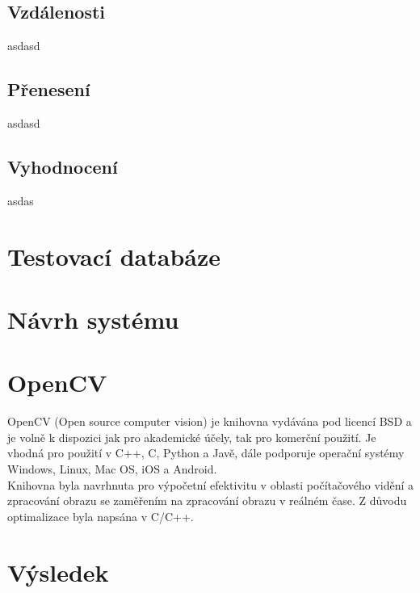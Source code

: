 \documentclass[czech,BP]{thesiskiv}
\begin{document}
\section{Vzdálenosti}
asdasd
\section{Přenesení}
asdasd
\section{Vyhodnocení}
asdas
\chapter{Testovací databáze}
\chapter{Návrh systému}
\chapter{OpenCV}
OpenCV (Open source computer vision) je knihovna vydávána pod licencí BSD a je volně k dispozici jak pro akademické účely, tak pro komerční použití. Je vhodná pro použití v C++, C, Python a Javě, dále podporuje operační systémy Windows, Linux, Mac OS, iOS a Android.\\
Knihovna byla navrhnuta pro výpočetní efektivitu v oblasti počítačového vidění a zpracování obrazu se zaměřením na zpracování obrazu v reálném čase. Z důvodu optimalizace byla napsána v C/C++.
\chapter{Výsledek}
\end{document}
